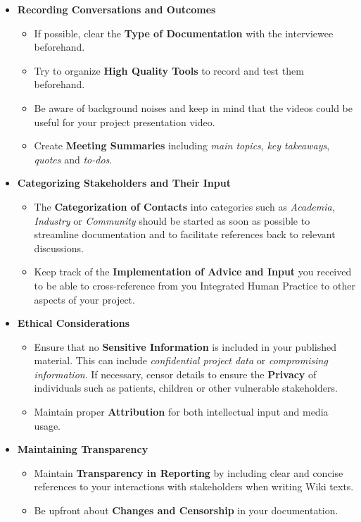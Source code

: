 \begin{itemize}
    \item \textbf{Recording Conversations and Outcomes }
    \begin{itemize}
        \item If possible, clear the \textbf{Type of Documentation} with the interviewee beforehand.
        \item Try to organize \textbf{High Quality Tools} to record and test them beforehand.
        \item Be aware of background noises and keep in mind that the videos could be useful for your project presentation video.
        \item Create \textbf{Meeting Summaries} including \textit{main topics}, \textit{key takeaways}, \textit{quotes} and \textit{to-dos}.
    \end{itemize}
    \item \textbf{Categorizing Stakeholders and Their Input}
    \begin{itemize} 
    \item The \textbf{Categorization of Contacts} into categories such as \textit{Academia, Industry} or \textit{Community} should be started as soon as possible to streamline documentation and to facilitate references back to relevant discussions.
    \item Keep track of the \textbf{Implementation of Advice and Input} you received to be able to cross-reference from you Integrated Human Practice to other aspects of your project.
    \end{itemize}
    \item \textbf{Ethical Considerations}
    \begin{itemize}
        \item Ensure that no \textbf{Sensitive Information} is included in your published material.
        This can include \textit{confidential project data} or \textit{compromising information}.
        If necessary, censor details to ensure the \textbf{Privacy} of individuals such as patients, children or other vulnerable stakeholders.
        \item Maintain proper \textbf{Attribution} for both intellectual input and media usage.
    \end{itemize}
    \item \textbf{Maintaining Transparency}
    \begin{itemize}
        \item Maintain \textbf{Transparency in Reporting} by including clear and concise references to your interactions with stakeholders when writing Wiki texts.
        \item Be upfront about \textbf{Changes and Censorship} in your documentation.
    \end{itemize}
\end{itemize}
